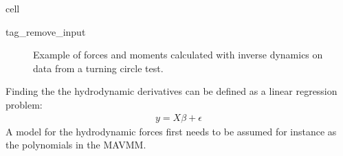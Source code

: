 \documentclass[review]{elsarticle}
\begin{document}
\begin{sphinxuseclass}{cell}
\begin{sphinxuseclass}{tag_remove_input}
\end{sphinxuseclass}
\end{sphinxuseclass}
\begin{figure}[H]
\centering
\capstart

\noindent{}
\caption{Example of forces and moments calculated with inverse dynamics on data from a turning circle test.}\label{\detokenize{03.01_inverse_dynamics:fig-inverse}}\end{figure}

\sphinxAtStartPar
Finding the the hydrodynamic derivatives can be defined as a linear regression problem:
\begin{equation}\label{equation:03.01_inverse_dynamics:eqregression}
\begin{split}y = X\beta + \epsilon\end{split}
\end{equation}
\sphinxAtStartPar
A model for the hydrodynamic forces first needs to be assumed for instance as the polynomials in the MAVMM.
\end{document}
